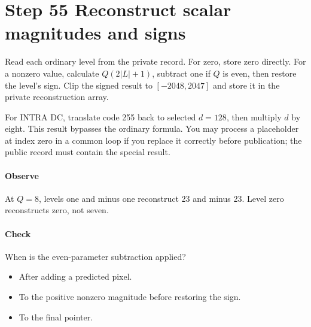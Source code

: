 \section{Step 55 Reconstruct scalar magnitudes and signs}\label{h263-quant-s05}
Read each ordinary level from the private record. For zero, store zero directly.
For a nonzero value, calculate $Q(2|L|+1)$, subtract one if $Q$ is even, then
restore the level's sign. Clip the signed result to $[-2048,2047]$ and store it
in the private reconstruction array.

For INTRA DC, translate code 255 back to selected $d=128$, then multiply $d$ by
eight. This result bypasses the ordinary formula. You may process a placeholder
at index zero in a common loop if you replace it correctly before publication;
the public record must contain the special result.

\paragraph{Observe} At $Q=8$, levels one and minus one reconstruct 23 and
minus 23. Level zero reconstructs zero, not seven.
\paragraph{Check} When is the even-parameter subtraction applied?
\begin{itemize}
  \item[A.] After adding a predicted pixel.
  \item[B.] To the positive nonzero magnitude before restoring the sign.
  \item[C.] To the final pointer.
\end{itemize}
